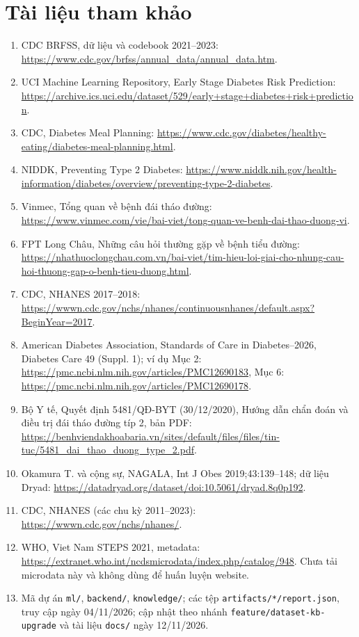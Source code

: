 \documentclass[12pt,a4paper]{article}
\renewcommand{\_}{\textunderscore\allowbreak}\setlength{\emergencystretch}{3em}
\begin{document}
\section*{Tài liệu tham khảo}
\begin{enumerate}
\item CDC BRFSS, dữ liệu và codebook 2021--2023: \url{https://www.cdc.gov/brfss/annual_data/annual_data.htm}.
\item UCI Machine Learning Repository, Early Stage Diabetes Risk Prediction: \url{https://archive.ics.uci.edu/dataset/529/early+stage+diabetes+risk+prediction}.
\item CDC, Diabetes Meal Planning: \url{https://www.cdc.gov/diabetes/healthy-eating/diabetes-meal-planning.html}.
\item NIDDK, Preventing Type 2 Diabetes: \url{https://www.niddk.nih.gov/health-information/diabetes/overview/preventing-type-2-diabetes}.
\item Vinmec, Tổng quan về bệnh đái tháo đường: \url{https://www.vinmec.com/vie/bai-viet/tong-quan-ve-benh-dai-thao-duong-vi}.
\item FPT Long Châu, Những câu hỏi thường gặp về bệnh tiểu đường: \url{https://nhathuoclongchau.com.vn/bai-viet/tim-hieu-loi-giai-cho-nhung-cau-hoi-thuong-gap-o-benh-tieu-duong.html}.
\item CDC, NHANES 2017--2018: \url{https://wwwn.cdc.gov/nchs/nhanes/continuousnhanes/default.aspx?BeginYear=2017}.
\item American Diabetes Association, Standards of Care in Diabetes--2026, Diabetes Care 49 (Suppl. 1); ví dụ Mục 2: \url{https://pmc.ncbi.nlm.nih.gov/articles/PMC12690183}, Mục 6: \url{https://pmc.ncbi.nlm.nih.gov/articles/PMC12690178}.
\item Bộ Y tế, Quyết định 5481/QĐ-BYT (30/12/2020), Hướng dẫn chẩn đoán và điều trị đái tháo đường típ 2, bản PDF: \url{https://benhviendakhoabaria.vn/sites/default/files/files/tin-tuc/5481_dai_thao_duong_type_2.pdf}.
\item Okamura T. và cộng sự, NAGALA, Int J Obes 2019;43:139--148; dữ liệu Dryad: \url{https://datadryad.org/dataset/doi:10.5061/dryad.8q0p192}.
\item CDC, NHANES (các chu kỳ 2011--2023): \url{https://wwwn.cdc.gov/nchs/nhanes/}.
\item WHO, Viet Nam STEPS 2021, metadata: \url{https://extranet.who.int/ncdsmicrodata/index.php/catalog/948}. Chưa tải microdata này và không dùng để huấn luyện website.
\item Mã dự án \texttt{ml/}, \texttt{backend/}, \texttt{knowledge/}; các tệp \texttt{artifacts/*/report.json}, truy cập ngày 04/11/2026; cập nhật theo nhánh \texttt{feature/dataset-kb-upgrade} và tài liệu \texttt{docs/} ngày 12/11/2026.
\end{enumerate}
\end{document}
